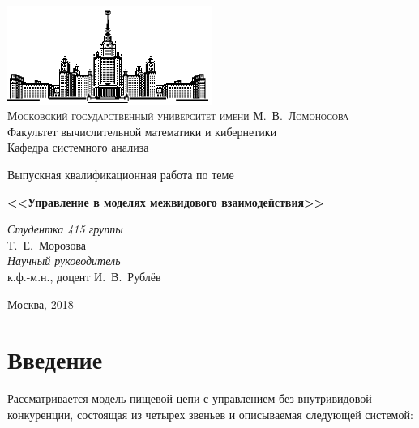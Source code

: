 \documentclass[11pt]{article}
\begin{document}
\thispagestyle{empty}

\begin{center}
\ \vspace{-3cm}

\includegraphics[width=0.5\textwidth]{msu.eps}\\
{\scshape Московский государственный университет имени М.~В.~Ломоносова}\\
Факультет вычислительной математики и кибернетики\\
Кафедра системного анализа

\vfill

{\LARGE Выпускная квалификационная работа по теме}

\vspace{1cm}

{\Huge\bfseries <<Управление в моделях межвидового взаимодействия>>}
\end{center}

\vspace{1cm}

\begin{flushright}
  \large
  \textit{Студентка 415 группы}\\
  Т.~Е.~Морозова\\
  \textit{Научный руководитель}\\
  к.ф.-м.н., доцент И.~В.~Рублёв 

  \vspace{5mm}

 \end{flushright}

\vfill

\begin{center}
Москва, 2018
\end{center}

\newpage
\tableofcontents
\newpage

\section{Введение}

Рассматривается модель пищевой цепи с управлением без внутривидовой конкуренции, состоящая из четырех звеньев и описываемая следующей системой:
\end{document}
